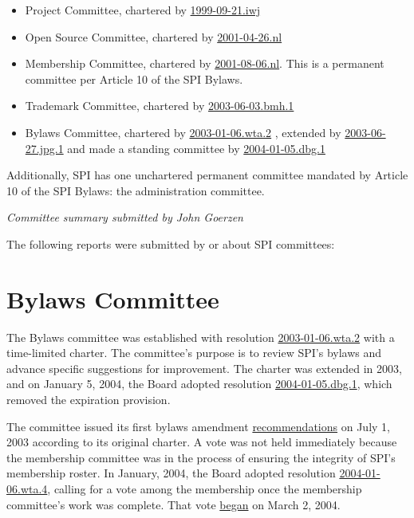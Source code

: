 \documentclass[letterpaper]{report}
\begin{document}
\begin{itemize}
\item Project Committee, chartered by \href{https://www.spi-inc.org/corporate/resolutions/1999/1999-09-21.iwj}{1999-09-21.iwj}
\item Open Source Committee, chartered by \href{https://www.spi-inc.org/corporate/resolutions/2001/2001-04-26.nl}{2001-04-26.nl}
\item Membership Committee, chartered by \href{https://www.spi-inc.org/corporate/resolutions/2001/2001-08-06.nl}{2001-08-06.nl}.
This is a permanent committee per Article 10 of the SPI Bylaws.
\item Trademark Committee, chartered by \href{https://www.spi-inc.org/corporate/resolutions/2003/2003-06-03.bmh.1}{2003-06-03.bmh.1}
\item Bylaws Committee, chartered by \href{https://www.spi-inc.org/corporate/resolutions/2003/2003-01-06.wta.2}{2003-01-06.wta.2}
, extended by \href{https://www.spi-inc.org/corporate/resolutions/2003/2003-06-27.jpg.1}{2003-06-27.jpg.1}
and made a standing committee by \href{http://lists.spi-inc.org/pipermail/spi-announce/2004/000067.html}{2004-01-05.dbg.1}
\end{itemize}

Additionally, SPI has one unchartered permanent committee mandated
by Article 10 of the SPI Bylaws: the administration committee.

\emph{Committee summary submitted by John Goerzen}

\vspace{1em}

The following reports were submitted by or about SPI committees:

\section{Bylaws Committee}

The Bylaws committee was established with resolution \href{https://www.spi-inc.org/corporate/resolutions/2003/2003-01-06.wta.2}{2003-01-06.wta.2}
with a time-limited charter. The committee's purpose is to review
SPI's bylaws and advance specific suggestions for improvement. The
charter was extended in 2003, and on January 5, 2004, the Board adopted
resolution \href{http://lists.spi-inc.org/pipermail/spi-announce/2004/000067.html}{2004-01-05.dbg.1},
which removed the expiration provision.

The committee issued its first bylaws amendment \href{http://gopher.quux.org:70/devel/bylaws/20030701.html}{recommendations}
on July 1, 2003 according to its original charter. A vote was not
held immediately because the membership committee was in the process
of ensuring the integrity of SPI's membership roster. In January,
2004, the Board adopted resolution \href{http://lists.spi-inc.org/pipermail/spi-announce/2004/000066.html}{2004-01-06.wta.4},
calling for a vote among the membership once the membership committee's
work was complete. That vote \href{http://lists.spi-inc.org/pipermail/spi-announce/2004/000071.html}{began}
on March 2, 2004.
\end{document}
